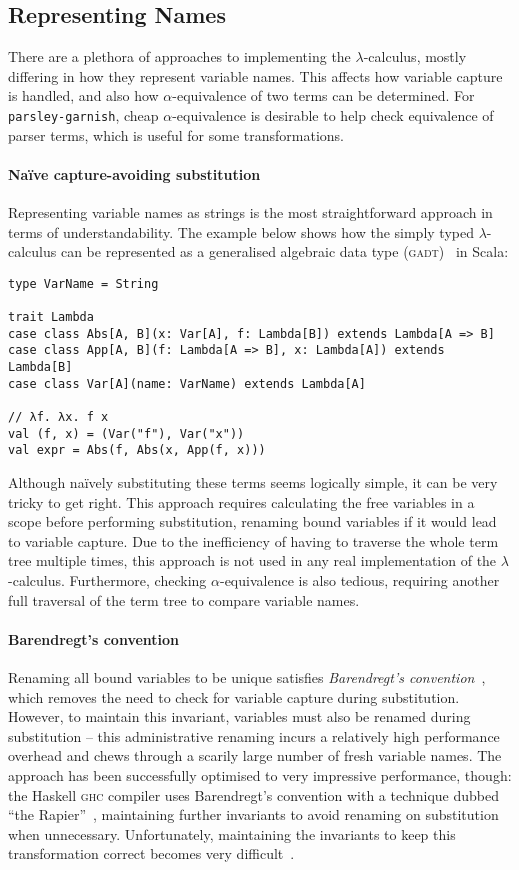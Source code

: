 \documentclass[../../../main.tex]{subfiles}
\begin{document}
\subsection{Representing Names}
There are a plethora of approaches to implementing the $\lambda$-calculus, mostly differing in how they represent variable names.
This affects how variable capture is handled, and also how $\alpha$-equivalence of two terms can be determined.
For \texttt{parsley-garnish}, cheap $\alpha$-equivalence is desirable to help check equivalence of parser terms, which is useful for some transformations.

\paragraph{Naïve capture-avoiding substitution}
Representing variable names as strings is the most straightforward approach in terms of understandability.
The example below shows how the simply typed $\lambda$-calculus can be represented as a generalised algebraic data type (\textsc{gadt})~\cite{cheney_gadt_2003} in Scala:

\begin{verbatim}
type VarName = String

trait Lambda
case class Abs[A, B](x: Var[A], f: Lambda[B]) extends Lambda[A => B]
case class App[A, B](f: Lambda[A => B], x: Lambda[A]) extends Lambda[B]
case class Var[A](name: VarName) extends Lambda[A]

// λf. λx. f x
val (f, x) = (Var("f"), Var("x"))
val expr = Abs(f, Abs(x, App(f, x)))
\end{verbatim}
%
Although naïvely substituting these terms seems logically simple, it can be very tricky to get right.
This approach requires calculating the free variables in a scope before performing substitution, renaming bound variables if it would lead to variable capture.
Due to the inefficiency of having to traverse the whole term tree multiple times, this approach is not used in any real implementation of the $\lambda$-calculus.
Furthermore, checking $\alpha$-equivalence is also tedious, requiring another full traversal of the term tree to compare variable names.

\paragraph{Barendregt's convention}
Renaming all bound variables to be unique satisfies \emph{Barendregt's convention}~\cite{barendregt_lambda_1984}, which removes the need to check for variable capture during substitution.
However, to maintain this invariant, variables must also be renamed during substitution -- this administrative renaming incurs a relatively high performance overhead and chews through a scarily large number of fresh variable names.
The approach has been successfully optimised to very impressive performance, though:
the Haskell \textsc{ghc} compiler uses Barendregt's convention with a technique dubbed ``the Rapier''~\cite{peytonjones_secrets_2002}, maintaining further invariants to avoid renaming on substitution when unnecessary.
Unfortunately, maintaining the invariants to keep this transformation correct becomes very difficult~\cite{maclaurin_thefoil_2023}.
\end{document}
